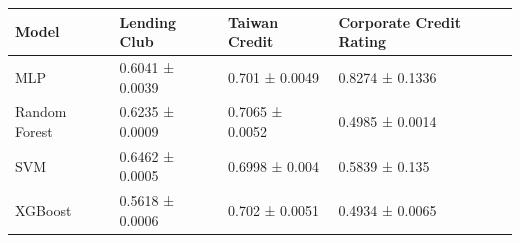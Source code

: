 \begin{tabular}{llll}
\toprule
Model & Lending Club & Taiwan Credit & Corporate Credit Rating \\
\midrule
MLP & 0.6041 ± 0.0039 & 0.701 ± 0.0049 & 0.8274 ± 0.1336 \\
Random Forest & 0.6235 ± 0.0009 & 0.7065 ± 0.0052 & 0.4985 ± 0.0014 \\
SVM & 0.6462 ± 0.0005 & 0.6998 ± 0.004 & 0.5839 ± 0.135 \\
XGBoost & 0.5618 ± 0.0006 & 0.702 ± 0.0051 & 0.4934 ± 0.0065 \\
\bottomrule
\end{tabular}
